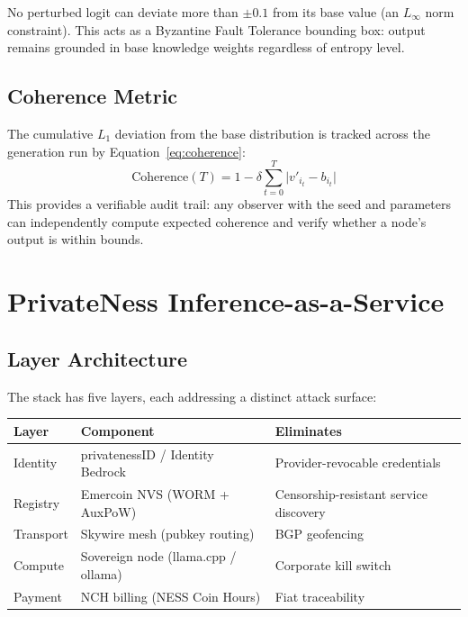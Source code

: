 \documentclass[11pt,a4paper]{article}
\begin{document}
No perturbed logit can deviate more than $\pm 0.1$ from its base value (an $L_\infty$ norm constraint). This acts as a Byzantine Fault Tolerance bounding box: output remains grounded in base knowledge weights regardless of entropy level.

\subsection{Coherence Metric}

The cumulative $L_1$ deviation from the base distribution is tracked across the generation run by Equation~\eqref{eq:coherence}:
\begin{equation}
\text{Coherence}(T) = 1 - \delta\sum_{t=0}^{T}\bigl|v'_{i_t} - b_{i_t}\bigr|
\label{eq:coherence}
\end{equation}
This provides a verifiable audit trail: any observer with the seed and parameters can independently compute expected coherence and verify whether a node's output is within bounds.

\section{PrivateNess Inference-as-a-Service}
\label{sec:iaas}

\subsection{Layer Architecture}

The stack has five layers, each addressing a distinct attack surface:

\begin{center}
\begin{tabular}{@{}lll@{}}
\toprule
Layer & Component & Eliminates \\
\midrule
Identity & privatenessID / Identity Bedrock & Provider-revocable credentials \\
Registry & Emercoin NVS (WORM + AuxPoW) & Censorship-resistant service discovery \\
Transport & Skywire mesh (pubkey routing) & BGP geofencing \\
Compute & Sovereign node (llama.cpp / ollama) & Corporate kill switch \\
Payment & NCH billing (NESS Coin Hours) & Fiat traceability \\
\bottomrule
\end{tabular}
\end{center}
\end{document}
